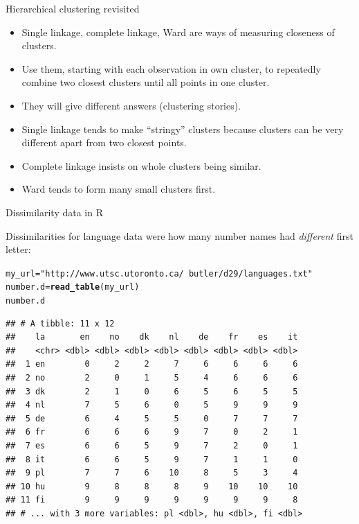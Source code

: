 \documentclass[unknownkeysallowed]{beamer}\usepackage[]{graphicx}\usepackage[]{color}
\makeatletter
\newcommand{\hlstr}[1]{\textcolor[rgb]{0.192,0.494,0.8}{#1}}%
\newcommand{\hlstd}[1]{\textcolor[rgb]{0.345,0.345,0.345}{#1}}%
\newcommand{\hlkwb}[1]{\textcolor[rgb]{0.69,0.353,0.396}{#1}}%
\newcommand{\hlkwd}[1]{\textcolor[rgb]{0.737,0.353,0.396}{\textbf{#1}}}%
\newenvironment{kframe}{%
 \def\at@end@of@kframe{}%
 \ifinner\ifhmode%
  \def\at@end@of@kframe{\end{minipage}}%
  \begin{minipage}{\columnwidth}%
 \fi\fi%
 \def\FrameCommand##1{\hskip\@totalleftmargin \hskip-\fboxsep
 \colorbox{shadecolor}{##1}\hskip-\fboxsep
     \hskip-\linewidth \hskip-\@totalleftmargin \hskip\columnwidth}%
 \MakeFramed {\advance\hsize-\width
   \@totalleftmargin\z@ \linewidth\hsize
   \@setminipage}}%
 {\par\unskip\endMakeFramed%
 \at@end@of@kframe}
\newenvironment{knitrout}{}{} %
\makeatother
\begin{document}
\begin{frame}[fragile]{Hierarchical clustering revisited}
  
  \begin{itemize}
  \item Single linkage, complete linkage, Ward are ways of measuring
    closeness of clusters.
  \item Use them, starting with each observation in own cluster, to
    repeatedly combine two closest clusters until all points in one
    cluster.
  \item They will give different answers (clustering stories). 
  \item Single linkage tends to make ``stringy'' clusters because
    clusters can be very different apart from two closest points.
  \item Complete linkage insists on whole clusters being similar.
  \item Ward tends to form many small clusters first.
  \end{itemize}
  
\end{frame}

\begin{frame}[fragile]{Dissimilarity data in R}


Dissimilarities for language data\label{p:numberd} were how many
number names had \emph{different} first letter:



\begin{knitrout}\scriptsize
{}\color{fgcolor}\begin{kframe}
\begin{alltt}
\hlstd{my_url}\hlkwb{=}\hlstr{"http://www.utsc.utoronto.ca/~butler/d29/languages.txt"}
\hlstd{number.d}\hlkwb{=}\hlkwd{read_table}\hlstd{(my_url)}
\hlstd{number.d}
\end{alltt}
\begin{verbatim}
## # A tibble: 11 x 12
##    la       en    no    dk    nl    de    fr    es    it
##    <chr> <dbl> <dbl> <dbl> <dbl> <dbl> <dbl> <dbl> <dbl>
##  1 en        0     2     2     7     6     6     6     6
##  2 no        2     0     1     5     4     6     6     6
##  3 dk        2     1     0     6     5     6     5     5
##  4 nl        7     5     6     0     5     9     9     9
##  5 de        6     4     5     5     0     7     7     7
##  6 fr        6     6     6     9     7     0     2     1
##  7 es        6     6     5     9     7     2     0     1
##  8 it        6     6     5     9     7     1     1     0
##  9 pl        7     7     6    10     8     5     3     4
## 10 hu        9     8     8     8     9    10    10    10
## 11 fi        9     9     9     9     9     9     9     8
## # ... with 3 more variables: pl <dbl>, hu <dbl>, fi <dbl>
\end{verbatim}
\end{kframe}
\end{knitrout}

\end{frame}
\end{document}
